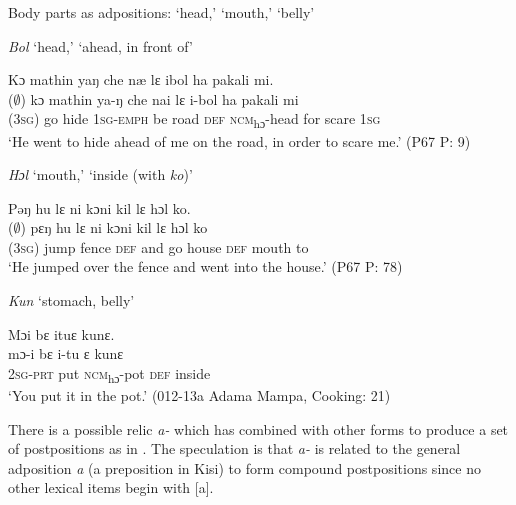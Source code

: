 \ea%
    \label{ex:89}
    Body parts as adpositions: ‘head,' ‘mouth,' ‘belly'\\

    \vspace{6pt}
    
	\ea \label{ex:89a} \textit{Bol} ‘head,' ‘ahead, in front of'\\

 \vspace{6pt}
    
	Kɔ  mathin yaŋ che næ lɛ ibol ha pakali mi.\\
	\gll ($\emptyset$)  kɔ    mathin  ya-ŋ      che  nai  lɛ    i-bol        ha    pakali  mi\\
	(\textsc{3sg})  go    hide    \textsc{1sg}{}-\textsc{emph}  be    road  \textsc{def}  \textsc{ncm}\textsubscript{hɔ}{}-head    for    scare    1\textsc{sg}\\
 \glt ‘He went to hide ahead of me on the road, in order to scare me.' (P67 P: 9)\\

\vspace{6pt}
    
  \ex \label{ex:89b}  \textit{Hɔl} ‘mouth,' ‘inside (with \textit{ko})'\\

  \vspace{6pt}
  
Pəŋ hu lɛ ni kɔni kil lɛ hɔl ko.\\
  \gll ($\emptyset$)  pɛŋ  hu    lɛ    ni    kɔni  kil      lɛ    hɔl    ko\\
  (\textsc{3sg})  jump  fence  \textsc{def}  and  go    house    \textsc{def}  mouth  to\\
  \glt ‘He jumped over the fence and went into the house.' (P67 P: 78)


    
  \ex \label{ex:89c}  \textit{Kun} ‘stomach, belly'\\

  \vspace{6pt}
  
  Mɔi bɛ ituɛ kunɛ.\\
  \gll mɔ-i    bɛ    i-tu      ɛ    kunɛ\\
  \textsc{2sg-prt}  put  \textsc{ncm}\textsubscript{hɔ}{}-pot  \textsc{def}  inside\\
  \glt ‘You put it in the pot.' (012-13a Adama Mampa, Cooking: 21)
\z
\z

There is a possible relic \textit{a-} which has combined with other forms to produce a set of postpositions as in . The speculation is that \textit{a-} is related to the general adposition \textit{a} (a preposition in Kisi) to form compound postpositions since no other lexical items begin with [a].

